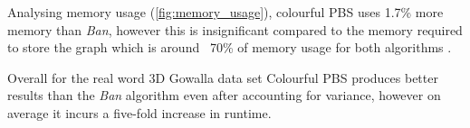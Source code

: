Analysing memory usage (\cref{fig:memory_usage}), colourful PBS uses 1.7\% more memory than \emph{Ban}, however this is insignificant compared to the memory required to store the graph which is around ~70\% of memory usage for both algorithms .

Overall for the real word 3D Gowalla data set Colourful PBS produces better results than the \emph{Ban} algorithm even after accounting for variance, however on average it incurs a five-fold increase in runtime.